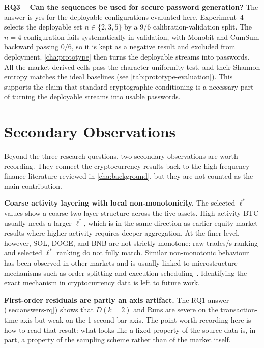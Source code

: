 \documentclass[11pt,titlepage,openany,oneside]{book}  %
\begin{document}
\textbf{RQ3 -- Can the sequences be used for secure password generation?} The answer is yes for the deployable configurations evaluated here. Experiment~4 selects the deployable set $n \in \{2,3,5\}$ by a 9/6 calibration-validation split. The $n=4$ configuration fails systematically in validation, with Monobit and CumSum backward passing $0/6$, so it is kept as a negative result and excluded from deployment. \cref{cha:prototype} then turns the deployable streams into passwords. All the market-derived cells pass the character-uniformity test, and their Shannon entropy matches the ideal baselines (see \cref{tab:prototype-evaluation}). This supports the claim that standard cryptographic conditioning is a necessary part of turning the deployable streams into usable passwords.

\section{Secondary Observations}
\label{sec:secondary-observations}

Beyond the three research questions, two secondary observations are worth recording. They connect the cryptocurrency results back to the high-frequency-finance literature reviewed in \cref{cha:background}, but they are not counted as the main contribution.

\textbf{Coarse activity layering with local non-monotonicity.} The selected $\ell^*$ values show a coarse two-layer structure across the five assets. High-activity BTC usually needs a larger $\ell^*$, which is in the same direction as earlier equity-market results where higher activity requires deeper aggregation. At the finer level, however, SOL, DOGE, and BNB are not strictly monotone: raw trades/s ranking and selected $\ell^*$ ranking do not fully match. Similar non-monotonic behaviour has been observed in other markets and is usually linked to microstructure mechanisms such as order splitting and execution scheduling~\citep{almgren2001execution}. Identifying the exact mechanism in cryptocurrency data is left to future work.

\textbf{First-order residuals are partly an axis artifact.} The RQ1 answer (\cref{sec:answers-rq}) shows that $D(k=2)$ and Runs are severe on the transaction-time axis but weak on the 1-second bar axis. The point worth recording here is how to read that result: what looks like a fixed property of the source data is, in part, a property of the sampling scheme rather than of the market itself.
\end{document}
